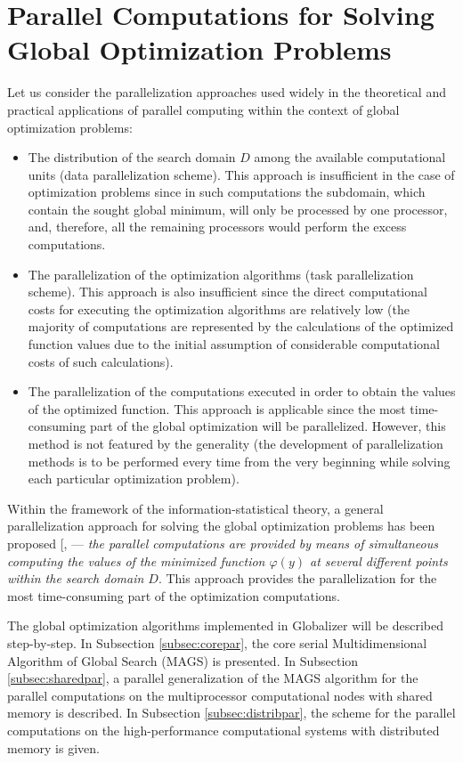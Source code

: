 \documentclass{aims}
\theoremstyle{definition}
\begin{document}
\section{Parallel Computations for Solving Global Optimization Problems}
\label{sec:parallel}
Let us consider the parallelization approaches used widely in the theoretical and
practical applications of parallel computing within the context of global optimization problems:
\begin{itemize}
  \item The distribution of the search domain \(D\) among the available computational units (data parallelization scheme). This approach is insufficient in the case of optimization problems since in such computations the subdomain, which contain the sought global minimum, will only be processed by one processor, and, therefore, all the remaining processors would perform the excess computations.
  \item The parallelization of the optimization algorithms (task parallelization scheme). This approach is also insufficient since the direct computational costs for executing the optimization algorithms are relatively low (the majority of computations are represented by the calculations of the optimized function values due to the initial assumption of considerable computational costs of such calculations).
  \item The parallelization of the computations executed in order to obtain the values of the optimized function. This approach is applicable since the most time-consuming part of the global optimization will be parallelized. However, this method is not featured by the generality (the development of parallelization methods is to be performed every time from the very beginning while solving each particular optimization problem).
\end{itemize}
\par
Within the framework of the information-statistical theory, a general parallelization
approach for solving the global optimization problems has been proposed [\cite{stronginGergelBarkalovParGO}, \cite{strSergGO} --- \textit{the
parallel computations are provided by means of simultaneous computing the values of the
minimized function \(\varphi(y)\) at several different points within the search domain \(D\)}.
This approach provides the parallelization for the most time-consuming part of the optimization computations.
\par
The global optimization algorithms implemented in Globalizer will be described step-by-step.
In Subsection \ref{subsec:corepar}, the core serial Multidimensional Algorithm of Global
Search (MAGS) is presented. In Subsection \ref{subsec:sharedpar}, a parallel generalization
of the MAGS algorithm for the parallel computations on the multiprocessor computational
nodes with shared memory is described. In Subsection \ref{subsec:distribpar}, the scheme
for the parallel computations on the high-performance computational systems with distributed memory is given.
\end{document}
